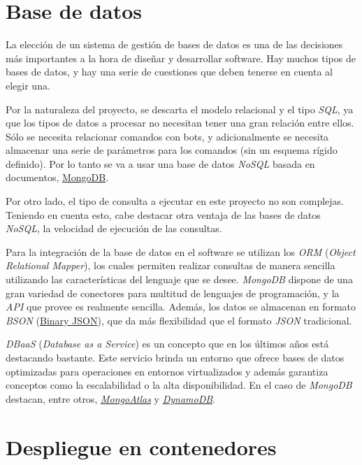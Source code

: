 \section{Base de datos}

La elección de un sistema de gestión de bases de datos es una de las decisiones más importantes a la hora de diseñar y desarrollar software. Hay muchos tipos de bases de datos, y hay una serie de cuestiones que deben tenerse en cuenta al elegir una.

Por la naturaleza del proyecto, se descarta el modelo relacional y el tipo \textit{SQL}, ya que los tipos de datos a procesar no necesitan tener una gran relación entre ellos. Sólo se necesita relacionar comandos con bots, y adicionalmente se necesita almacenar una serie de parámetros para los comandos (sin un esquema rígido definido). Por lo tanto se va a usar una base de datos \textit{NoSQL} basada en documentos, \href{https://www.mongodb.com/es}{MongoDB}.

Por otro lado, el tipo de consulta a ejecutar en este proyecto no son complejas. Teniendo en cuenta esto, cabe destacar otra ventaja de las bases de datos \textit{NoSQL}, la velocidad de ejecución de las consultas.

Para la integración de la base de datos en el software se utilizan los \textit{ORM} (\textit{Object Relational Mapper}), los cuales permiten realizar consultas de manera sencilla utilizando las características del lenguaje que se desee. \textit{MongoDB} dispone de una gran variedad de conectores para multitud de lenguajes de programación, y la \textit{API} que provee es realmente sencilla. Además, los datos se almacenan en formato \textit{BSON} (\href{https://www.mongodb.com/json-and-bson}{Binary JSON}), que da más flexibilidad que el formato \textit{JSON} tradicional.

\textit{DBaaS} (\textit{Database as a Service}) es un concepto que en los últimos años está destacando bastante. Este servicio brinda un entorno que ofrece bases de datos optimizadas para operaciones en entornos virtualizados y además garantiza conceptos como la escalabilidad o la alta disponibilidad. En el caso de \textit{MongoDB} destacan, entre otros, \href{https://www.mongodb.com/atlas/database}{\textit{MongoAtlas}} y \href{https://aws.amazon.com/es/dynamodb/}{\textit{DynamoDB}}.

\section{Despliegue en contenedores}

